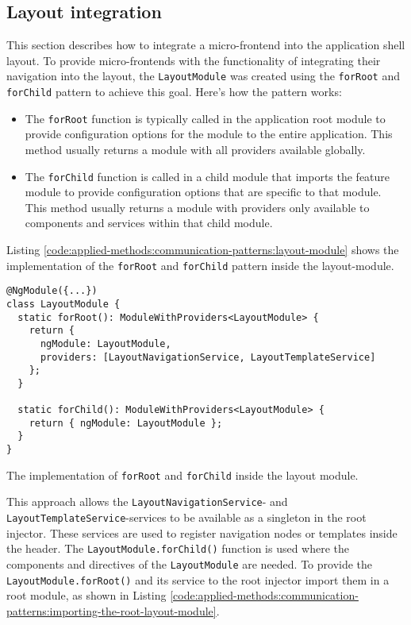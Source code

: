 \subsection{Layout integration}\label{subsection:applied-methods:communication-patterns:layout-integration}

This section describes how to integrate a micro-frontend into the application shell layout. To provide micro-frontends with the functionality of integrating their navigation into the layout, the \texttt{LayoutModule} was created using the \texttt{forRoot} and \texttt{forChild} pattern to achieve this goal. Here's how the pattern works:

\begin{itemize}
  \item The \texttt{forRoot} function is typically called in the application root module to provide configuration options for the module to the entire application. This method usually returns a module with all providers available globally.
  \item The \texttt{forChild} function is called in a child module that imports the feature module to provide configuration options that are specific to that module. This method usually returns a module with providers only available to components and services within that child module.
\end{itemize}

\noindent Listing \ref{code:applied-methods:communication-patterns:layout-module} shows the implementation of the \texttt{forRoot} and \texttt{forChild} pattern inside the layout-module.

\ifshowListings
\begin{listing}[H]
  \begin{verbatim}
@NgModule({...})
class LayoutModule {
  static forRoot(): ModuleWithProviders<LayoutModule> {
    return {
      ngModule: LayoutModule,
      providers: [LayoutNavigationService, LayoutTemplateService]
    };
  }

  static forChild(): ModuleWithProviders<LayoutModule> {
    return { ngModule: LayoutModule };
  }
}
  \end{verbatim}
  \caption{The implementation of \texttt{forRoot} and \texttt{forChild} inside the layout module.}\label{code:applied-methods:communication-patterns:layout-module}
\end{listing}
\fi

\noindent This approach allows the \texttt{LayoutNavigationService}- and \texttt{LayoutTemplateService}-services to be available as a singleton in the root injector. These services are used to register navigation nodes or templates inside the header. The \texttt{LayoutModule.forChild()} function is used where the components and directives of the \texttt{LayoutModule} are needed. To provide the \texttt{LayoutModule.forRoot()} and its service to the root injector import them in a root module, as shown in Listing \ref{code:applied-methods:communication-patterns:importing-the-root-layout-module}.

